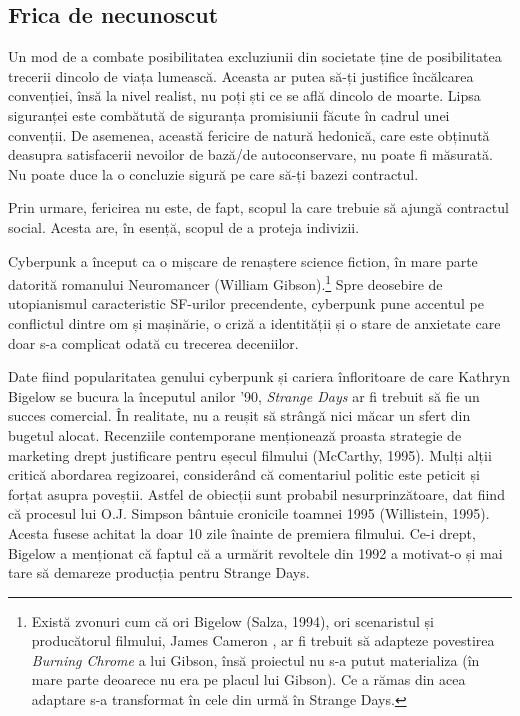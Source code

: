 \documentclass[12pt]{article}
\begin{document}
	 	\subsection{Frica de necunoscut}
	 	
	 	Un mod de a combate posibilitatea excluziunii din societate ține de posibilitatea trecerii dincolo de viața lumească. Aceasta ar putea să-ți justifice încălcarea convenției, însă la nivel realist, nu poți ști ce se află dincolo de moarte. Lipsa siguranței este combătută de siguranța promisiunii făcute în cadrul unei convenții. De asemenea, această fericire de natură hedonică, care este obținută deasupra satisfacerii nevoilor de bază/de autoconservare, nu poate fi măsurată. Nu poate duce la o concluzie sigură pe care să-ți bazezi contractul.
	 	
	 	Prin urmare, fericirea nu este, de fapt, scopul la care trebuie să ajungă contractul social. Acesta are, în esență, scopul de a proteja indivizii.
	 	
	
	
Cyberpunk a început ca o mișcare de renaștere science fiction, în mare parte datorită romanului Neuromancer (William Gibson).\footnote{Există zvonuri cum că ori Bigelow (Salza, 1994), ori scenaristul și producătorul filmului, James Cameron \parencite{bibid}, ar fi trebuit să adapteze povestirea \textit{Burning Chrome} a lui Gibson, însă proiectul nu s-a putut materializa (în mare parte deoarece nu era pe placul lui Gibson). Ce a rămas din acea adaptare s-a transformat în cele din urmă în Strange Days.} Spre deosebire de utopianismul caracteristic SF-urilor precendente, cyberpunk pune accentul pe conflictul dintre om și mașinărie, o criză a identității și o stare de anxietate care doar s-a complicat odată cu trecerea deceniilor.\break

Date fiind popularitatea genului cyberpunk și cariera înfloritoare de care Kathryn Bigelow se bucura la începutul anilor '90, \textit{Strange Days} ar fi trebuit să fie un succes comercial. În realitate, nu a reușit să strângă nici măcar un sfert din bugetul alocat. Recenziile contemporane menționează proasta strategie de marketing drept justificare pentru eșecul filmului (McCarthy, 1995). Mulți alții critică abordarea regizoarei, considerând că comentariul politic este peticit și forțat asupra poveștii. Astfel de obiecții sunt probabil nesurprinzătoare, dat fiind că procesul lui O.J. Simpson bântuie cronicile toamnei 1995 (Willistein, 1995). Acesta fusese achitat la doar 10 zile înainte de premiera filmului. Ce-i drept, Bigelow a menționat că faptul că a urmărit revoltele din 1992 a motivat-o și mai tare să demareze producția pentru Strange Days.\break
\end{document}
